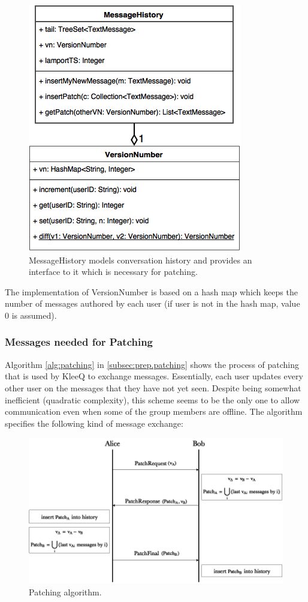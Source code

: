 \documentclass[a4paper, 12pt]{report}
\begin{document}
\begin{figure}[H]
    \captionsetup{width=0.76\textwidth}
    \centering
    \includegraphics[width=0.4\linewidth]{pics/history_uml.png}
    \caption{\label{fig:history_uml} MessageHistory models conversation history and provides an interface to it which is necessary for patching.}
\end{figure}
The implementation of VersionNumber is based on a hash map which keeps the number of messages authored by each user (if user is not in the hash map, value 0 is assumed).



\subsubsection{Messages needed for Patching}
Algorithm \ref{alg:patching} in \cref{subsec:prep.patching} shows the process of patching that is used by KleeQ to exchange messages. Essentially, each user updates every other user on the messages that they have not yet seen. Despite being somewhat inefficient (quadratic complexity), this scheme seems to be the only one to allow communication even when some of the group members are offline. The algorithm specifies the following kind of message exchange:

\begin{figure}[H]
    \captionsetup{width=0.76\textwidth}
    \centering
    \includegraphics[width=0.8\linewidth]{pics/patching_orig.png}
    \caption{\label{fig:patching_orig} Patching algorithm.}
\end{figure}
\end{document}
